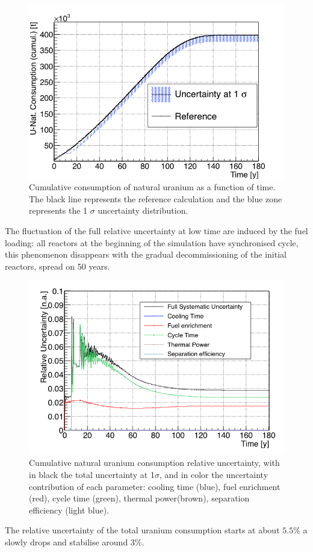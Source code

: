 \documentclass{anstrans}
\begin{document}
\begin{figure}[ht] %
    \centering
    \includegraphics[scale=0.35]{unat_full}
    \caption{Cumulative consumption of natural uranium as a function of time.  The black line
        represents the reference calculation and the blue zone
        represents the 1 $\sigma$ uncertainty distribution.}\label{fig:unat_full}
\end{figure}


The fluctuation of the full relative uncertainty at low time are induced by the
fuel loading: all reactors at the beginning of the simulation have synchronised
cycle, this phenomenon disappears with the gradual decommissioning of the
initial reactors, spread on 50 years.


\begin{figure}[h!!] %
    \centering
    \includegraphics[scale=0.35]{unat_uncer}
    \caption{Cumulative natural uranium consumption relative uncertainty, with
    in black the total uncertainty at 1$\sigma$, and in color the uncertainty
    contribution of each parameter: cooling time (blue), fuel enrichment (red),
    cycle time (green), thermal power(brown), separation efficiency (light
    blue).}\label{fig:unatr_uncer}
\end{figure}
The relative uncertainty of the total uranium consumption starts at about
$5.5\%$ a slowly drops and stabilise around $3\%$.
\end{document}
